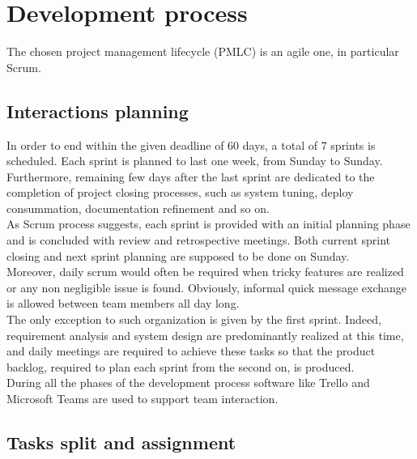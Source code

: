 \chapter{Development process}

The chosen project management lifecycle (PMLC) is an agile one, in particular Scrum. 
\section{Interactions planning}

In order to end within the given deadline of 60 days, a total of 7 sprints is scheduled. Each sprint is planned to last one week, from Sunday to Sunday. Furthermore, remaining few days after the last sprint are dedicated to the completion of project closing processes, such as system tuning, deploy consummation, documentation refinement and so on.
\\
As Scrum process suggests, each sprint is provided with an initial planning phase and is concluded with review and retrospective meetings. Both current sprint closing and next sprint planning are supposed to be done on Sunday.
\\
Moreover, daily scrum would often be required when tricky features are realized or any non negligible issue is found. Obviously, informal quick message exchange is allowed between team members all day long.
\\
The only exception to such organization is given by the first sprint. Indeed, requirement analysis and system design are predominantly realized at this time, and daily meetings are required to achieve these tasks so that the product backlog, required to plan each sprint from the second on, is produced.
\\
During all the phases of the development process software like Trello and Microsoft Teams are used to support team interaction.


\section{Tasks split and assignment}

